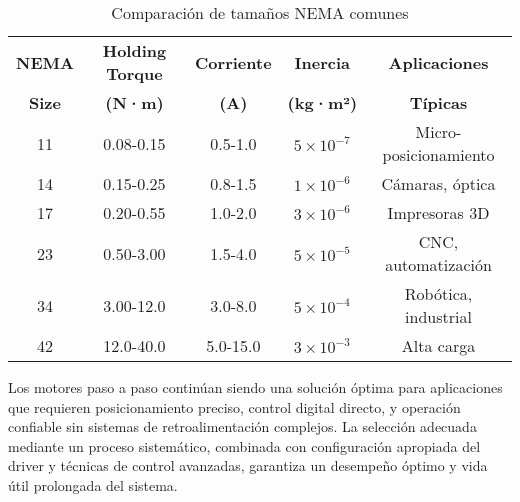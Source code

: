 \begin{table}[ht]
\centering
\caption{Comparación de tamaños NEMA comunes}
\begin{tabular}{|c|c|c|c|c|}
\hline
\textbf{NEMA} & \textbf{Holding Torque} & \textbf{Corriente} & \textbf{Inercia} & \textbf{Aplicaciones} \\
\textbf{Size} & \textbf{(N·m)} & \textbf{(A)} & \textbf{(kg·m²)} & \textbf{Típicas} \\
\hline
11 & 0.08-0.15 & 0.5-1.0 & $5 \times 10^{-7}$ & Micro-posicionamiento \\
\hline
14 & 0.15-0.25 & 0.8-1.5 & $1 \times 10^{-6}$ & Cámaras, óptica \\
\hline
17 & 0.20-0.55 & 1.0-2.0 & $3 \times 10^{-6}$ & Impresoras 3D \\
\hline
23 & 0.50-3.00 & 1.5-4.0 & $5 \times 10^{-5}$ & CNC, automatización \\
\hline
34 & 3.00-12.0 & 3.0-8.0 & $5 \times 10^{-4}$ & Robótica, industrial \\
\hline
42 & 12.0-40.0 & 5.0-15.0 & $3 \times 10^{-3}$ & Alta carga \\
\hline
\end{tabular}
\end{table}

Los motores paso a paso continúan siendo una solución óptima para aplicaciones que requieren posicionamiento preciso, control digital directo, y operación confiable sin sistemas de retroalimentación complejos. La selección adecuada mediante un proceso sistemático, combinada con configuración apropiada del driver y técnicas de control avanzadas, garantiza un desempeño óptimo y vida útil prolongada del sistema.
